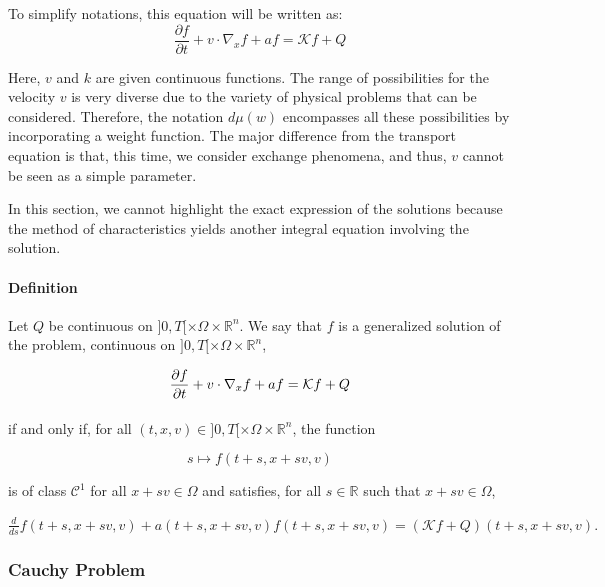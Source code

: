 \documentclass[a4paper, 11pt]{article}
\begin{document}
To simplify notations, this equation will be written as: 
\[ \frac{\partial f}{\partial t}+v \cdot \nabla_x f +af =   \mathcal{K} f +Q \]

Here, $v$ and $k$ are given continuous functions. The range of possibilities for the velocity $v$ is very diverse due to the variety of physical problems that can be considered. Therefore, the notation $d\mu(w)$ encompasses all these possibilities by incorporating a weight function. The major difference from the transport equation is that, this time, we consider exchange phenomena, and thus, $v$ cannot be seen as a simple parameter.

In this section, we cannot highlight the exact expression of the solutions because the method of characteristics yields another integral equation involving the solution.




\paragraph{Definition}

Let $Q$ be continuous on $]0,T[\times \Omega \times \mathbb{R}^n$. We say that $f$ is a generalized solution of the problem, continuous on $]0,T[\times \Omega \times \mathbb{R}^n$,


$$\frac{\partial f}{\partial t}+v \cdot \nabla_x f +af = \mathcal{K} f +Q\\$$

\paragraph{}
if and only if, for all $(t,x,v) \in ]0,T[\times \Omega \times \mathbb{R}^n$, the function 

\[ s \mapsto f(t+s,x+sv,v) \]

is of class $\mathcal{C}^1$ for all $x+sv \in \Omega$ and satisfies, for all $s \in \mathbb{R}$ such that $x +sv \in \Omega$,

$\frac{d}{ds}f(t+s,x+sv,v) +a(t+s,x+sv,v)f(t+s,x+sv,v) = (\mathcal{K}f+ Q)(t+s,x+sv,v).$

\subsubsection{Cauchy Problem}
\paragraph{}
\end{document}
